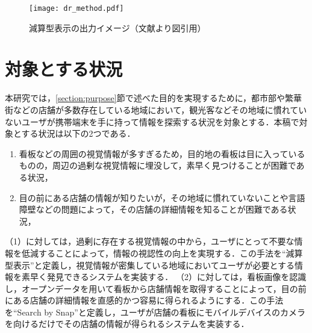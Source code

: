     \begin{figure}[tb]
      \centerline{\texttt{[image: dr\_method.pdf]}}
      \caption{減算型表示の出力イメージ（文献\cite{Kitamura:2017a}より図引用）}
      \label{figure:dr_method}
    \end{figure}

\section{対象とする状況}
\label{section:target_situation}
  本研究では，\ref{section:purpose}節で述べた目的を実現するために，都市部や繁華街などの店舗が多数存在している地域において，観光客などその地域に慣れていないユーザが携帯端末を手に持って情報を探索する状況を対象とする．本稿で対象とする状況は以下の2つである．
  \begin{enumerate}
    \item 看板などの周囲の視覚情報が多すぎるため，目的地の看板は目に入っているものの，周辺の過剰な視覚情報に埋没して，素早く見つけることが困難である状況，
    \item 目の前にある店舗の情報が知りたいが，その地域に慣れていないことや言語障壁などの問題によって，その店舗の詳細情報を知ることが困難である状況，
  \end{enumerate}
  （1）に対しては，過剰に存在する視覚情報の中から，ユーザにとって不要な情報を低減することによって，情報の視認性の向上を実現する．この手法を``減算型表示''と定義し，視覚情報が密集している地域においてユーザが必要とする情報を素早く発見できるシステムを実装する．
  （2）に対しては，看板画像を認識し，オープンデータを用いて看板から店舗情報を取得することによって，目の前にある店舗の詳細情報を直感的かつ容易に得られるようにする．この手法を``Search by Snap''と定義し，ユーザが店舗の看板にモバイルデバイスのカメラを向けるだけでその店舗の情報が得られるシステムを実装する．
  
